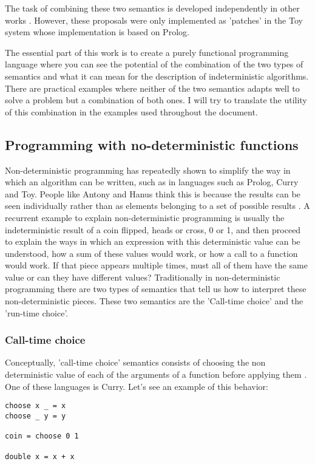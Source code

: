 \documentclass[class=article, crop=false]{standalone}
\begin{document}
The task of combining these two semantics is developed independently in other works
\cite{riesco2014singular}. However, these proposals were only implemented as 'patches' in the
Toy system whose implementation is based on Prolog.

The essential part of this work is to create a purely functional programming language where
you can see the potential of the combination of the two types of semantics and what it can
mean for the description of indeterministic algorithms. There are practical examples where
neither of the two semantics adapts well to solve a problem but a combination of both ones. I
will try to translate the utility of this combination in the examples used throughout the
document.

\subsection{Programming with no-deterministic functions}

Non-deterministic programming has repeatedly shown to simplify the way in which an algorithm
can be written, such as in languages such as Prolog, Curry and Toy. People like Antony and
Hanus think this is because the results can be seen individually rather than as elements
belonging to a set of possible results \cite{antoy2010functional}. A recurrent example to
explain non-deterministic programming is usually the indeterministic result of a coin
flipped, heads or cross, 0 or 1, and then proceed to explain the ways in which an expression
with this deterministic value can be understood, how a sum of these values would work, or how
a call to a function would work. If that piece appears multiple times, must all of them have
the same value or can they have different values? Traditionally in non-deterministic
programming there are two types of semantics that tell us how to interpret these
non-deterministic pieces. These two semantics are the 'Call-time choice' and the 'run-time
choice'.

\subsubsection{Call-time choice}

Conceptually, 'call-time choice' semantics consists of choosing the non deterministic value
of each of the arguments of a function before applying them \cite{fischer2011purely}. One of
these languages is Curry. Let's see an example of this behavior:

\begin{verbatim}
choose x _ = x
choose _ y = y

coin = choose 0 1

double x = x + x
\end{verbatim}
\end{document}
